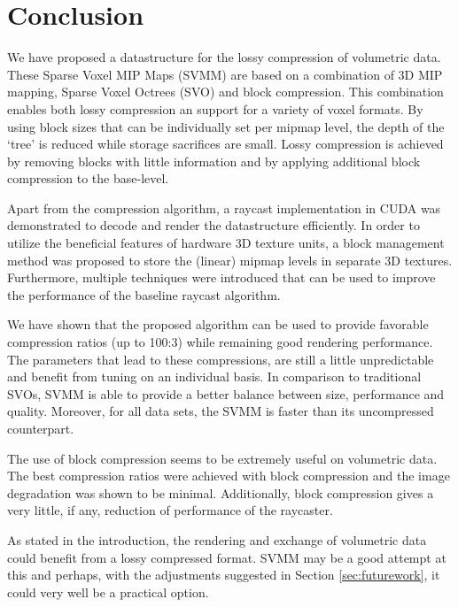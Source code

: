 \section{Conclusion} \label{ch:conclusions}
%
We have proposed a datastructure for the lossy compression of volumetric data. These Sparse Voxel MIP Maps (SVMM) are based on a combination of 3D MIP mapping, Sparse Voxel Octrees (SVO) and block compression. This combination enables both lossy compression an support for a variety of voxel formats. By using block sizes that can be individually set per mipmap level, the depth of the `tree' is reduced while storage sacrifices are small. Lossy compression is achieved by removing blocks with little information and by applying additional block compression to the base-level.

Apart from the compression algorithm, a raycast implementation in CUDA was demonstrated to decode and render the datastructure efficiently. In order to utilize the beneficial features of hardware 3D texture units, a block management method was proposed to store the (linear) mipmap levels in separate 3D textures. Furthermore, multiple techniques were introduced that can be used to improve the performance of the baseline raycast algorithm.

We have shown that the proposed algorithm can be used to provide favorable compression ratios (up to 100:3) while remaining good rendering performance. The parameters that lead to these compressions, are still a little unpredictable and benefit from tuning on an individual basis. In comparison to traditional SVOs, SVMM is able to provide a better balance between size, performance and quality. Moreover, for all data sets, the SVMM is faster than its uncompressed counterpart.

The use of block compression seems to be extremely useful on volumetric data. The best compression ratios were achieved with block compression and the image degradation was shown to be minimal. Additionally, block compression gives a very little, if any, reduction of performance of the raycaster.

As stated in the introduction, the rendering and exchange of volumetric data could benefit from a lossy compressed format. SVMM may be a good attempt at this and perhaps, with the adjustments suggested in Section \ref{sec:futurework}, it could very well be a practical option.
%